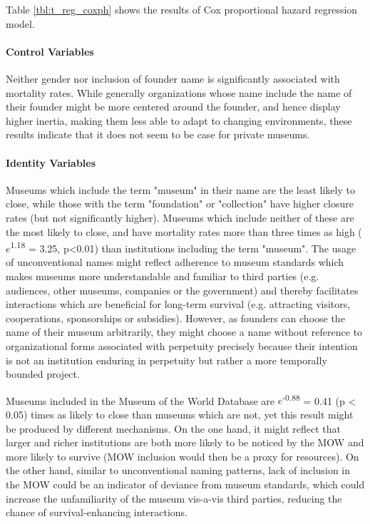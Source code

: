 \documentclass[12pt]{article}
\begin{document}
Table \ref{tbl:t_reg_coxph} shows the results of Cox proportional hazard regression model.


\paragraph*{Control Variables}
\label{sec:org75141bd}

Neither gender nor inclusion of founder name is significantly associated with mortality rates.
While generally organizations whose name include the name of their founder might be more centered around the founder, and hence display higher inertia, making them less able to adapt to changing environments, these results indicate that it does not seem to be case for private museums.


\paragraph*{Identity Variables}
\label{sec:orge692d76}

Museums which include the term "museum" in their name are the least likely to close, while those with the term "foundation" or "collection" have higher closure rates (but not significantly higher).
Museums which include neither of these are the most likely to close, and have mortality rates more than three times as high (\(e\)\textsuperscript{1.18} = 3.25, p<0.01) than institutions including the term "museum".
The usage of unconventional names might reflect adherence to museum standards which makes museums more understandable and familiar to third parties (e.g. audiences, other museums, companies or the government) and thereby facilitates interactions which are beneficial for long-term survival (e.g. attracting visitors, cooperations, sponsorships or subsidies).
However, as founders can choose the name of their museum arbitrarily, they might choose a name without reference to organizational forms associated with perpetuity precisely because their intention is not an institution enduring in perpetuity but rather a more temporally bounded project.


Museums included in the Museum of the World Database are \(e\)\textsuperscript{-0.88} = 0.41 (p < 0.05) times as likely to close than museums which are not, yet this result might be produced by different mechanisms.
On the one hand, it might reflect that larger and richer institutions are both more likely to be noticed by the MOW and more likely to survive (MOW inclusion would then be a proxy for resources).
On the other hand, similar to unconventional naming patterns, lack of inclusion in the MOW could be an indicator of deviance from museum standards, which could increase the unfamiliarity of the museum vis-a-vis third parties, reducing the chance of survival-enhancing interactions.
\end{document}
